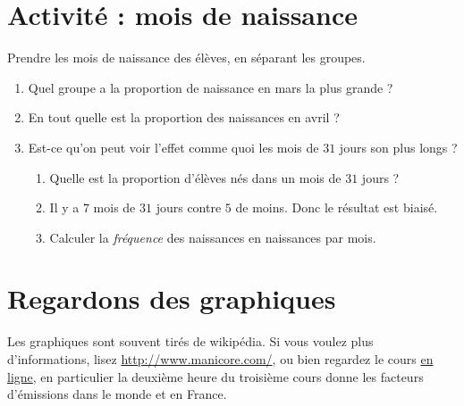 
\section{Activité : mois de naissance}

Prendre les mois de naissance des élèves, en séparant les groupes.
\begin{enumerate}
    \item
        Quel groupe a la proportion de naissance en mars la plus grande ?
    \item
        En tout quelle est la proportion des naissances en avril ?
    \item 
        Est-ce qu'on peut voir l'effet comme quoi les mois de \( 31\) jours son plus longs ? 
        \begin{enumerate}
            \item
                Quelle est la proportion d'élèves nés dans un mois de \( 31\) jours ?
            \item
                Il y a \( 7\) mois de $31$ jours contre \( 5\) de moins. Donc le résultat est biaisé.
            \item
                Calculer la \emph{fréquence} des naissances en naissances par mois.
        \end{enumerate}
\end{enumerate}

\section{Regardons des graphiques}

Les graphiques sont souvent tirés de wikipédia. Si vous voulez plus d'informations, lisez \url{http://www.manicore.com/}, ou bien regardez le cours \href{http://www.mines-paristech.fr/ingenieurcivil/SitesIC/Balado/Climat_som.html}{en ligne}, en particulier la deuxième heure du troisième cours donne les facteurs d'émissions dans le monde et en France.


